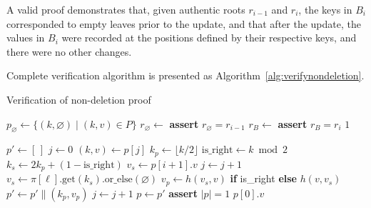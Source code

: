 \documentclass[twocolumn]{article}
\begin{document}
A valid proof demonstrates that, given authentic roots $r_{i-1}$ and $r_i$, the keys in $B_i$ corresponded to empty leaves prior to the update, and that after the update, the values in $B_i$ were recorded at the positions defined by their respective keys, and there were no other changes.

Complete verification algorithm is presented as Algorithm~\ref{alg:verifynondeletion}.

\begin{algorithm}[htb]
  \caption{Verification of non-deletion proof}\label{alg:verifynondeletion}
  \begin{algorithmic}[0]
      \State   {}
      \State   {}
      \State   {}
      \State $p_\varnothing \gets \{(k, \varnothing) \mid (k, v) \in P\}$ 
      \State $r_\varnothing \gets$ 
      \State \textbf{assert} $r_\varnothing = r_{i-1}$
      \State {}
      \State $r_B \gets$ 
      \State \textbf{assert} $r_B = r_i$
      \State \Return $1$ 
    \EndFunction

        \State $p' \gets [\,]$
        \State $j \gets 0$
          \State $(k, v) \gets p[j]$
          \State $k_p \gets \lfloor k / 2 \rfloor$ 
          \State $\text{is\_right} \gets k \bmod 2$
          \State $k_s \gets 2k_p + (1 - \text{is\_right})$ 
            \State $v_s \gets p[i+1].v$  
            \State $j \gets j + 1$       
          \Else                          {}
            \State                       {}
            \State $v_s \gets \pi[\ell].\text{get}(k_s).\text{or\_else}( \varnothing)$
          \EndIf
          \State $v_p \gets h(v_s, v)$ \textbf{if} is\_right \textbf{else} $h(v, v_s)$
          \State $p' \gets p' \| (k_p, v_p)$
          \State $j \gets j + 1$
        \EndWhile
        \State $p \gets p'$
      \EndFor
      \State \textbf{assert} $|p| = 1$ 
      \State \Return $p[0].v$ 
    \EndFunction
  \end{algorithmic}
\end{algorithm}
\end{document}
